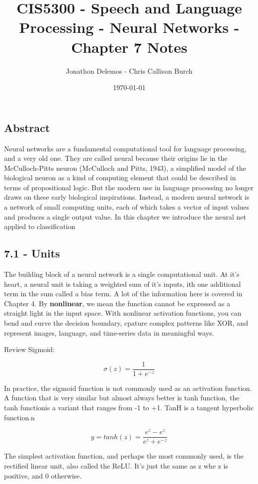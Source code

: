 \documentclass{article}
\title{CIS5300 - Speech and Language Processing - Neural Networks - Chapter 7 Notes}
\author{Jonathon Delemos - Chris Callison Burch}
\date{\today}
\begin{document}
\maketitle

\subsection{Abstract}

Neural networks are a fundamental computational tool for language processing, and a very old one. They are called neural because their origins lie in the
McCulloch-Pitts neuron (McCulloch and Pitts, 1943), a simplified model of the
biological neuron as a kind of computing element that could be described in terms
of propositional logic. But the modern use in language processing no longer draws
on these early biological inspirations.
Instead, a modern neural network is a network of small computing units, each
of which takes a vector of input values and produces a single output value. In this
chapter we introduce the neural net applied to classification

\subsection{7.1 - Units}

The building block of a neural network is a single computational unit. At it's heart, a neural unit is taking a weighted sum of it's inputs, ith one additional term in the sum called a bias term. \newline
A lot of the information here is covered in Chapter 4. By \textbf{nonlinear}, we mean the function cannot be expressed as a straight light in the input space.
With nonlinear activation functions, you can bend and curve the decision boundary, cpature complex patterns like XOR, and represent images, language, and time-series data in meaningful ways.

Review Sigmoid:

\[
    \sigma (z) = \frac{1}{1+e^{-z}}
\]

In practice, the sigmoid function is not commonly used as an activation function. A function that is very similar but almost always better is tanh function, the tanh functionis a variant that ranges from -1 to +1.
TanH is a tangent hyperbolic function.n

\[
    y = tanh(z) = \frac{e^z-e^{z}}{e^z+ e^{-z}}
\]


The simplest activation function, and perhaps the most commonly used, is the rectified linear unit, also called the ReLU.
It's just the same as z whe z is positive, and 0 otherwise.
\end{document}
